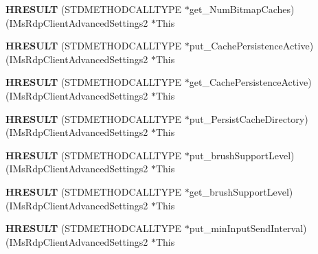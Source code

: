 \begin{DoxyCompactItemize}
{\bfseries H\+R\+E\+S\+U\+LT} (S\+T\+D\+M\+E\+T\+H\+O\+D\+C\+A\+L\+L\+T\+Y\+PE $\ast$get\+\_\+\+Num\+Bitmap\+Caches)(I\+Ms\+Rdp\+Client\+Advanced\+Settings2 $\ast$This
\item 
\mbox{\label{struct_i_ms_rdp_client_advanced_settings2_vtbl_a521bdd1f847274bd15432cf4052db173}} 
{\bfseries H\+R\+E\+S\+U\+LT} (S\+T\+D\+M\+E\+T\+H\+O\+D\+C\+A\+L\+L\+T\+Y\+PE $\ast$put\+\_\+\+Cache\+Persistence\+Active)(I\+Ms\+Rdp\+Client\+Advanced\+Settings2 $\ast$This
\item 
\mbox{\label{struct_i_ms_rdp_client_advanced_settings2_vtbl_a0a0d2c0b8585a6179e127e3e5e9a7b68}} 
{\bfseries H\+R\+E\+S\+U\+LT} (S\+T\+D\+M\+E\+T\+H\+O\+D\+C\+A\+L\+L\+T\+Y\+PE $\ast$get\+\_\+\+Cache\+Persistence\+Active)(I\+Ms\+Rdp\+Client\+Advanced\+Settings2 $\ast$This
\item 
\mbox{\label{struct_i_ms_rdp_client_advanced_settings2_vtbl_abddce74b590f074eb6a0cdf5706a206e}} 
{\bfseries H\+R\+E\+S\+U\+LT} (S\+T\+D\+M\+E\+T\+H\+O\+D\+C\+A\+L\+L\+T\+Y\+PE $\ast$put\+\_\+\+Persist\+Cache\+Directory)(I\+Ms\+Rdp\+Client\+Advanced\+Settings2 $\ast$This
\item 
\mbox{\label{struct_i_ms_rdp_client_advanced_settings2_vtbl_a1721c520ae137735e899b5532c357e79}} 
{\bfseries H\+R\+E\+S\+U\+LT} (S\+T\+D\+M\+E\+T\+H\+O\+D\+C\+A\+L\+L\+T\+Y\+PE $\ast$put\+\_\+brush\+Support\+Level)(I\+Ms\+Rdp\+Client\+Advanced\+Settings2 $\ast$This
\item 
\mbox{\label{struct_i_ms_rdp_client_advanced_settings2_vtbl_a50fc6060014832dda23386b8c0dc2460}} 
{\bfseries H\+R\+E\+S\+U\+LT} (S\+T\+D\+M\+E\+T\+H\+O\+D\+C\+A\+L\+L\+T\+Y\+PE $\ast$get\+\_\+brush\+Support\+Level)(I\+Ms\+Rdp\+Client\+Advanced\+Settings2 $\ast$This
\item 
\mbox{\label{struct_i_ms_rdp_client_advanced_settings2_vtbl_af560cf284f3c2b7a51f9f3785ad65a56}} 
{\bfseries H\+R\+E\+S\+U\+LT} (S\+T\+D\+M\+E\+T\+H\+O\+D\+C\+A\+L\+L\+T\+Y\+PE $\ast$put\+\_\+min\+Input\+Send\+Interval)(I\+Ms\+Rdp\+Client\+Advanced\+Settings2 $\ast$This

\end{DoxyCompactItemize}
